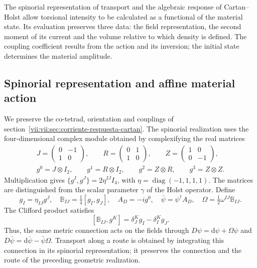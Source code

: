 The spinorial representation of transport and the algebraic response
of Cartan--Holst allow torsional intensity to be calculated as a
functional of the material state. Its evaluation preserves three data:
the field representation, the second moment of its current and
the volume relative to which density is defined. The coupling
coefficient results from the action and its inversion; the initial state
determines the material amplitude.

\subsection{Spinorial representation and affine material action}
\label{vii:vii:subsec:accion-espinorial-afin}

We preserve the co-tetrad, orientation and couplings of
section~\ref{vii:vii:sec:corriente-respuesta-cartan}. The spinorial
realization uses the four-dimensional complex module obtained by
complexifying the real matrices
\begin{equation}
 \begin{gathered}
 J=\begin{pmatrix}0&-1\\1&0\end{pmatrix},\qquad
 R=\begin{pmatrix}0&1\\1&0\end{pmatrix},\qquad
 Z=\begin{pmatrix}1&0\\0&-1\end{pmatrix},\\
 g^0=J\otimes I_2,\qquad g^1=R\otimes I_2,\qquad
 g^2=Z\otimes R,\qquad g^3=Z\otimes Z.
 \end{gathered}
 \label{vii:vii:eq:clifford-material-explicito}
\end{equation}
Multiplication gives
\(\{g^I,g^J\}=2\eta^{IJ}I_4\), with
\(\eta=\operatorname{diag}(-1,1,1,1)\). The matrices are
distinguished from the scalar parameter \(\gamma\) of the Holst
operator. Define
\begin{equation}
 g_I=\eta_{IJ}g^J,\quad
 \mathbb B_{IJ}=\tfrac14[g_I,g_J],\quad
 A_D=-i g^0,\quad \bar\psi=\psi^\dagger A_D,\quad
 \Omega=\tfrac12\omega^{IJ}\mathbb B_{IJ}.
 \label{vii:vii:eq:adjunto-conexion-espinorial}
\end{equation}
The Clifford product satisfies
\[
 [\mathbb B_{IJ},g^K]=\delta_J^K g_I-\delta_I^K g_J.
\]
Thus, the same metric connection acts on the fields through
\(D\psi=\mathrm d\psi+\Omega\psi\) and
\(D\bar\psi=\mathrm d\bar\psi-\bar\psi\Omega\).
Transport along a route is obtained by integrating this connection in
its spinorial representation; it preserves the connection and the route of the
preceding geometric realization.

